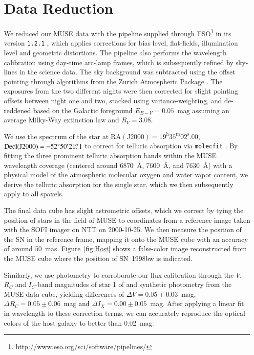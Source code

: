 \documentclass[traditabstract, referee]{aa}
\newcommand{\farc}{\hbox{$.\!\!^{\prime\prime}$}}
\begin{document}
\section{Data Reduction}
\label{sec:red}
We reduced our MUSE data with the pipeline supplied through ESO\footnote{http://www.eso.org/sci/software/pipelines/} in its version \texttt{1.2.1} \citep{2014ASPC..485..451W}, which applies corrections for bias level, flat-fields, illumination level and geometric distortions. The pipeline also performs the wavelength calibration using day-time arc-lamp frames, which is subsequently refined by sky-lines in the science data. The sky background was subtracted using the offset pointing through algorithms from the Zurich Atmospheric Package \citep{2016MNRAS.458.3210S}. The exposures from the two different nights were then corrected for slight pointing offsets between night one and two, stacked using variance-weighting, and de-reddened based on the Galactic foreground $E_{B-V}=0.05$~mag \citep{2011ApJ...737..103S} assuming an average Milky-Way extinction law \citep{1992ApJ...395..130P} and $R_V=3.08$. 

{We use the spectrum of the star at $\mathrm{RA(J2000)=19^{h}35^{m}02^{s}.00}$, $\mathrm{Decl(J2000)} = -52\degr50\arcmin21\farc{1}$ to correct for telluric absorption via \texttt{molecfit} \citep{2015A&A...576A..77S}. By fitting the three prominent telluric absorption bands within the MUSE wavelength coverage (centered around 6870~\AA, 7600~\AA, and 7630~\AA) with a physical model of the atmospheric molecular oxygen and water vapor content, we derive the telluric absorption for the single star, which we then subsequently apply to all spaxels.}

The final data cube has slight astrometric offsets, which we correct by tying the position of stars in the field of MUSE to coordinates from a reference image taken with the SOFI imager on NTT on 2000-10-25. We then measure the position of the SN in the reference frame, mapping it onto the MUSE cube with an accuracy of around 50~mas. Figure~\ref{fig:Host} shows a false-color image reconstructed from the MUSE cube where the position of SN~1998bw is indicated.

Similarly, we use photometry to corroborate our flux calibration through the $V$, $R_C$ and $I_C$-band magnitudes of star 1 of \citet{2011AJ....141..163C} and synthetic photometry from the MUSE data cube, yielding differences of $\Delta V = 0.05\pm0.03$~mag, $\Delta R_C = 0.05\pm0.06$~mag and $\Delta I_X = 0.00\pm0.05$~mag. After applying a linear fit in wavelength to these correction terms, we can accurately reproduce the optical colors of the host galaxy \citep{2005NewA...11..103S} to better than 0.02~mag.
\end{document}
